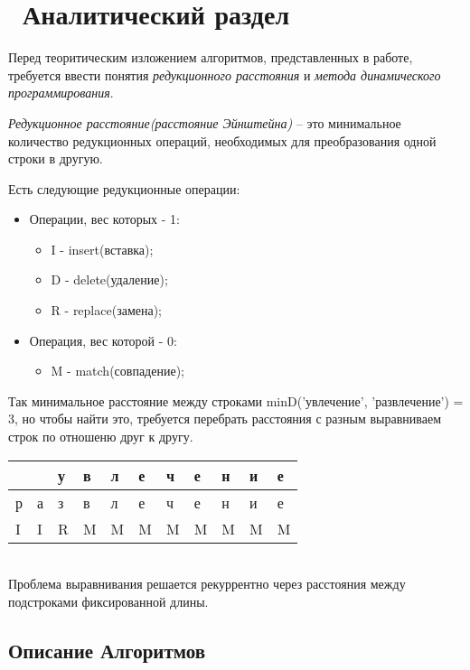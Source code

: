 \chapter{ Аналитический раздел}
\label{cha:analysis}

Перед теоритическим изложением алгоритмов, представленных в работе, требуется ввести понятия \textit{редукционного расстояния} и \textit{метода динамического программирования}. 

\textit{Редукционное расстояние(расстояние Эйнштейна)} -- это минимальное количество  редукционных операций, необходимых для преобразования одной строки в другую. 

Есть следующие редукционные операции:
\begin{itemize}
\item Операции, вес которых - 1:
\begin{itemize}
 \item I - insert(вставка);
 \item D - delete(удаление);
 \item R - replace(замена);
\end{itemize}
\item Операция, вес которой - 0:
\begin{itemize}
 \item M - match(совпадение);
\end{itemize}
\end{itemize}

Так минимальное расстояние между строками minD('увлечение', 'развлечение') = 3, но чтобы найти это, требуется перебрать расстояния с разным выравниваем строк по отношеню друг к другу.\\

\begin{tabu} to 0.8\textwidth { | X[c] | X[c] | X[c] | X[c] | X[c] | X[c] | X[c] | X[c] | X[c] | X[c] | X[c] | }
 \hline
    &  & у & в & л & е & ч & е & н & и & е \\
 \hline
    р & а & з & в & л & е & ч & е & н & и & е  \\
 \hline
    I & I & R & M & M & M & M & M & M & M & M  \\
\hline
\end{tabu}\\

Проблема выравнивания решается рекуррентно через расстояния между подстроками фиксированной длины.

\section{ Описание Алгоритмов}
